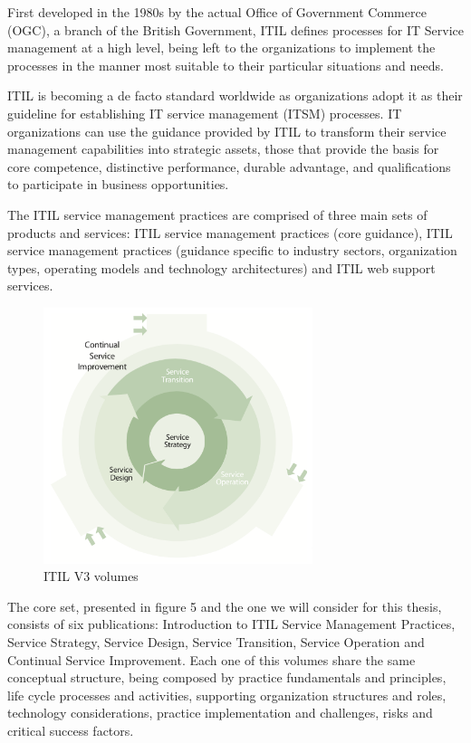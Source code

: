 First developed in the 1980s by the actual Office of Government Commerce (OGC), a branch of the British Government, ITIL defines processes for IT Service management at a high level, being left to the organizations to implement the processes in the manner most suitable to their particular situations and needs.\par
ITIL is becoming a de facto standard worldwide as organizations adopt it as their guideline for establishing IT service management (ITSM) processes. IT organizations can use the guidance provided by ITIL to transform their service management capabilities into strategic assets, those that provide the basis for core competence, distinctive performance, durable advantage, and qualifications to participate in business opportunities.\par
The ITIL service management practices are comprised of three main sets of products and services: ITIL service management practices (core guidance), ITIL service management practices (guidance specific to industry sectors, organization types, operating models and technology architectures) and ITIL web support services.\par

\begin{figure}
\centering
\includegraphics[width=0.7\textwidth]{img/ITILVolumes.png}
\caption{ITIL V3 volumes}
\end{figure}

The core set, presented in figure 5 and the one we will consider for this thesis, consists of six publications: Introduction to ITIL Service Management Practices, Service Strategy, Service Design, Service Transition, Service Operation and Continual Service Improvement. Each one of this volumes share the same conceptual structure, being composed by practice fundamentals and principles, life cycle processes and activities, supporting organization structures and roles, technology considerations, practice implementation and challenges, risks and critical success factors.

